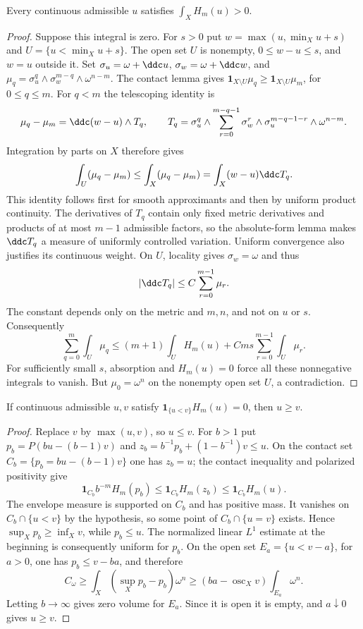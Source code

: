 \begin{lemma}\label{draft:605-hessian-nonvanishing}
Every continuous admissible $u$ satisfies $\int_X H_m(u)>0$.
\end{lemma}
\begin{proof}
Suppose this integral is zero. For $s>0$ put
$w=\max(u,\min_Xu+s)$ and $U=\{u<\min_Xu+s\}$.
The open set $U$ is nonempty, $0\leq w-u\leq s$, and $w=u$ outside it.
Set $\sigma_u=\omega+\ddc u$, $\sigma_w=\omega+\ddc w$, and
$\mu_q=\sigma_u^q\wedge\sigma_w^{m-q}\wedge\omega^{n-m}$.
The contact lemma gives $\mathbf1_{X\setminus U}\mu_q\geq
\mathbf1_{X\setminus U}\mu_m$, for $0\leq q\leq m$.
For $q<m$ the telescoping identity is
\[
 \mu_q-\mu_m=\ddc(w-u)\wedge T_q,\qquad
 T_q=\sigma_u^q\wedge
       \sum_{r=0}^{m-q-1}\sigma_w^r\wedge\sigma_u^{m-q-1-r}
                                      \wedge\omega^{n-m}.
\]
Integration by parts on $X$ therefore gives
\[
 \int_U(\mu_q-\mu_m)\leq\int_X(\mu_q-\mu_m)
                                =\int_X(w-u)\ddc T_q.
\]
This identity follows first for smooth approximants and then by uniform
product continuity. The derivatives of $T_q$ contain only fixed metric
derivatives and products of at most $m-1$ admissible factors, so the
absolute-form lemma makes $\ddc T_q$ a measure of uniformly controlled
variation. Uniform convergence also justifies its continuous weight.
On $U$, locality gives $\sigma_w=\omega$ and thus
\[
 |\ddc T_q|\leq C\sum_{r=0}^{m-1}\mu_r.
\]
The constant depends only on the metric and $m,n$, and not on $u$ or $s$.
Consequently
\[
 \sum_{q=0}^m\int_U\mu_q
 \leq(m+1)\int_U H_m(u)+Cms\sum_{r=0}^{m-1}\int_U\mu_r.
\]
For sufficiently small $s$, absorption and $H_m(u)=0$ force all these
nonnegative integrals to vanish. But $\mu_0=\omega^n$ on the nonempty
open set $U$, a contradiction.
\end{proof}

\begin{proposition}\label{draft:605-zero-hessian-domination}
If continuous admissible $u,v$ satisfy
$\mathbf1_{\{u<v\}}H_m(u)=0$, then $u\geq v$.
\end{proposition}
\begin{proof}
Replace $v$ by $\max(u,v)$, so $u\leq v$.
For $b>1$ put $p_b=P(bu-(b-1)v)$ and
$z_b=b^{-1}p_b+(1-b^{-1})v\leq u$.
On the contact set $C_b=\{p_b=bu-(b-1)v\}$ one has $z_b=u$;
the contact inequality and polarized positivity give
\[
 \mathbf1_{C_b}b^{-m}H_m(p_b)
                 \leq\mathbf1_{C_b}H_m(z_b)
                 \leq\mathbf1_{C_b}H_m(u).
\]
The envelope measure is supported on $C_b$ and has positive mass.
It vanishes on $C_b\cap\{u<v\}$ by the hypothesis, so some point of
$C_b\cap\{u=v\}$ exists. Hence
$\sup_Xp_b\geq\inf_Xv$, while $p_b\leq u$.
The normalized linear $L^1$ estimate at the beginning is consequently
uniform for $p_b$. On the open set $E_a=\{u<v-a\}$, for $a>0$, one has
$p_b\leq v-ba$, and therefore
\[
 C_\omega\geq\int_X(\sup_Xp_b-p_b)\omega^n
                     \geq(ba-\operatorname{osc}_Xv)\int_{E_a}\omega^n.
\]
Letting $b\to\infty$ gives zero volume for $E_a$. Since it is open it
is empty, and $a\downarrow0$ gives $u\geq v$.
\end{proof}

